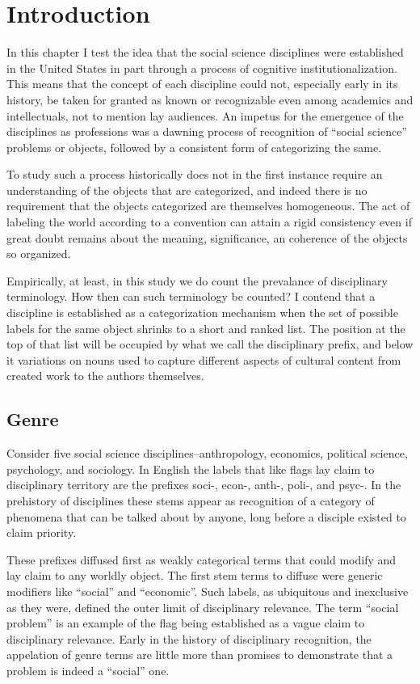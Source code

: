 \section{Introduction}\label{introduction}

In this chapter I test the idea that the social science disciplines were
established in the United States in part through a process of cognitive
institutionalization. This means that the concept of each discipline
could not, especially early in its history, be taken for granted as
known or recognizable even among academics and intellectuals, not to
mention lay audiences. An impetus for the emergence of the disciplines
as professions was a dawning process of recognition of ``social
science'' problems or objects, followed by a consistent form of
categorizing the same.

To study such a process historically does not in the first instance
require an understanding of the objects that are categorized, and indeed
there is no requirement that the objects categorized are themselves
homogeneous. The act of labeling the world according to a convention can
attain a rigid consistency even if great doubt remains about the
meaning, significance, an coherence of the objects so organized.

Empirically, at least, in this study we do count the prevalance of
disciplinary terminology. How then can such terminology be counted? I
contend that a discipline is established as a categorization mechanism
when the set of possible labels for the same object shrinks to a short
and ranked list. The position at the top of that list will be occupied
by what we call the disciplinary prefix, and below it variations on
nouns used to capture different aspects of cultural content from created
work to the authors themselves.

\subsection{Genre}\label{genre}

Consider five social science disciplines--anthropology, economics,
political science, psychology, and sociology. In English the labels that
like flags lay claim to disciplinary territory are the prefixes soci-,
econ-, anth-, poli-, and psyc-. In the prehistory of disciplines these
stems appear as recognition of a category of phenomena that can be
talked about by anyone, long before a disciple existed to claim
priority.

These prefixes diffused first as weakly categorical terms that could
modify and lay claim to any worldly object. The first stem terms to
diffuse were generic modifiers like ``social'' and ``economic''. Such
labels, as ubiquitous and inexclusive as they were, defined the outer
limit of disciplinary relevance. The term ``social problem'' is an
example of the flag being established as a vague claim to disciplinary
relevance. Early in the history of disciplinary recognition, the
appelation of genre terms are little more than promises to demonstrate
that a problem is indeed a ``social'' one.

